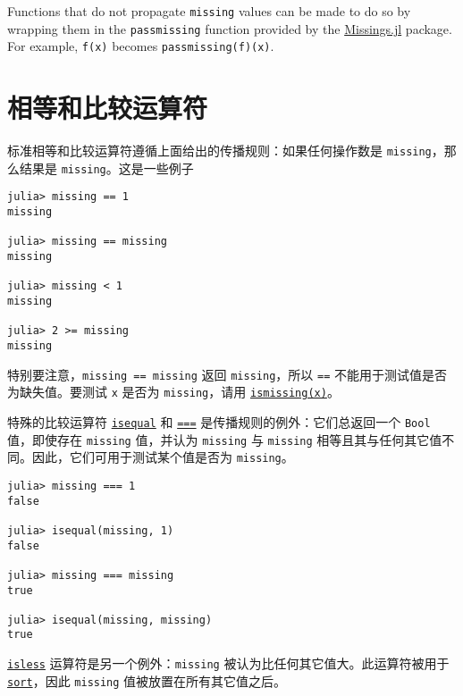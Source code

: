 Functions that do not propagate \texttt{missing} values can be made to do so by wrapping them in the \texttt{passmissing} function provided by the \href{https://github.com/JuliaData/Missings.jl}{Missings.jl} package. For example, \texttt{f(x)} becomes \texttt{passmissing(f)(x)}.



\hypertarget{13926030736377467708}{}


\section{相等和比较运算符}



标准相等和比较运算符遵循上面给出的传播规则：如果任何操作数是 \texttt{missing}，那么结果是 \texttt{missing}。这是一些例子




\begin{verbatim}
julia> missing == 1
missing

julia> missing == missing
missing

julia> missing < 1
missing

julia> 2 >= missing
missing
\end{verbatim}



特别要注意，\texttt{missing == missing} 返回 \texttt{missing}，所以 \texttt{==} 不能用于测试值是否为缺失值。要测试 \texttt{x} 是否为 \texttt{missing}，请用 \hyperlink{3452327148507948899}{\texttt{ismissing(x)}}。



特殊的比较运算符 \hyperlink{269533589463185031}{\texttt{isequal}} 和 \hyperlink{7974744969331231272}{\texttt{===}} 是传播规则的例外：它们总返回一个 \texttt{Bool} 值，即使存在 \texttt{missing} 值，并认为 \texttt{missing} 与 \texttt{missing} 相等且其与任何其它值不同。因此，它们可用于测试某个值是否为 \texttt{missing}。




\begin{verbatim}
julia> missing === 1
false

julia> isequal(missing, 1)
false

julia> missing === missing
true

julia> isequal(missing, missing)
true
\end{verbatim}



\hyperlink{8062916604071842790}{\texttt{isless}} 运算符是另一个例外：\texttt{missing} 被认为比任何其它值大。此运算符被用于 \hyperlink{8473525809131227606}{\texttt{sort}}，因此 \texttt{missing} 值被放置在所有其它值之后。




